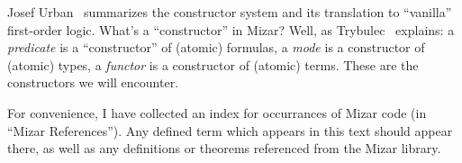 Josef Urban~\cite{urban2003translating} summarizes the constructor
system and its translation to ``vanilla'' first-order logic. What's a
``constructor'' in Mizar? Well, as Trybulec~\cite{trybulec1993some}
explains: a \emph{predicate} is a ``constructor'' of (atomic) formulas,
a \emph{mode} is a constructor of (atomic) types, a \emph{functor} is a
constructor of (atomic) terms. These are the constructors we will
encounter.

\bigbreak
For convenience, I have collected an index for occurrances of Mizar code
(in ``Mizar References''). Any defined term which appears in this text
should appear there, as well as any definitions or theorems referenced
from the Mizar library.


